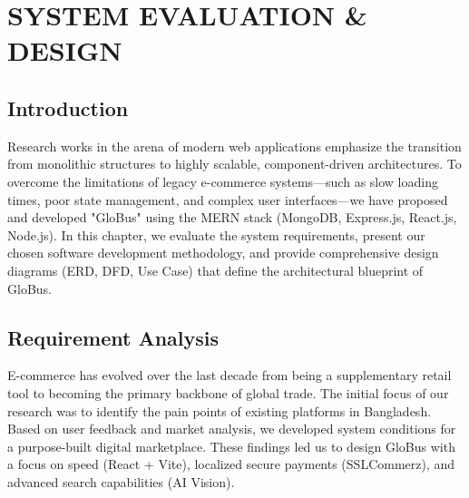 \chapter{SYSTEM EVALUATION \& DESIGN}
\section{Introduction}
Research works in the arena of modern web applications emphasize the transition from monolithic structures to highly scalable, component-driven architectures. To overcome the limitations of legacy e-commerce systems—such as slow loading times, poor state management, and complex user interfaces—we have proposed and developed "GloBus" using the MERN stack (MongoDB, Express.js, React.js, Node.js). In this chapter, we evaluate the system requirements, present our chosen software development methodology, and provide comprehensive design diagrams (ERD, DFD, Use Case) that define the architectural blueprint of GloBus.

\section{Requirement Analysis}
E-commerce has evolved over the last decade from being a supplementary retail tool to becoming the primary backbone of global trade. The initial focus of our research was to identify the pain points of existing platforms in Bangladesh. Based on user feedback and market analysis, we developed system conditions for a purpose-built digital marketplace. These findings led us to design GloBus with a focus on speed (React + Vite), localized secure payments (SSLCommerz), and advanced search capabilities (AI Vision). 

